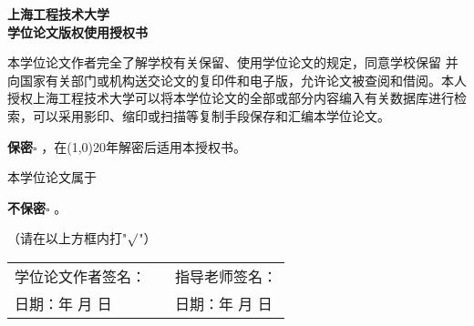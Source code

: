 
\newpage
\begin{center}\heiti\sanhao\textbf{
    上海工程技术大学 \\
    学位论文版权使用授权书}
\end{center}

本学位论文作者完全了解学校有关保留、使用学位论文的规定，同意学校保留
并向国家有关部门或机构送交论文的复印件和电子版，允许论文被查阅和借阅。本人
授权上海工程技术大学可以将本学位论文的全部或部分内容编入有关数据库进行检
索，可以采用影印、缩印或扫描等复制手段保存和汇编本学位论文。

\hspace{7em}\textbf{保密}$\square$ ，在\line(1,0){20}年解密后适用本授权书。

本学位论文属于

\hspace{7em}\textbf{不保密}$\square$ 。

（请在以上方框内打\quad "\emph{$\surd$}"）

\vspace{15em}
\begin{table}[hbpt]
    \centering
    \renewcommand\arraystretch{1.8}
    \begin{tabular}{p{6cm}<{\raggedright}p{2cm}<{\centering}p{6cm}<{\raggedright}}
        学位论文作者签名：& & 指导老师签名： \\
        日期：\qquad 年 \qquad 月 \qquad 日 & & 日期：\qquad 年 \qquad 月 \qquad 日
    \end{tabular}
\end{table}


